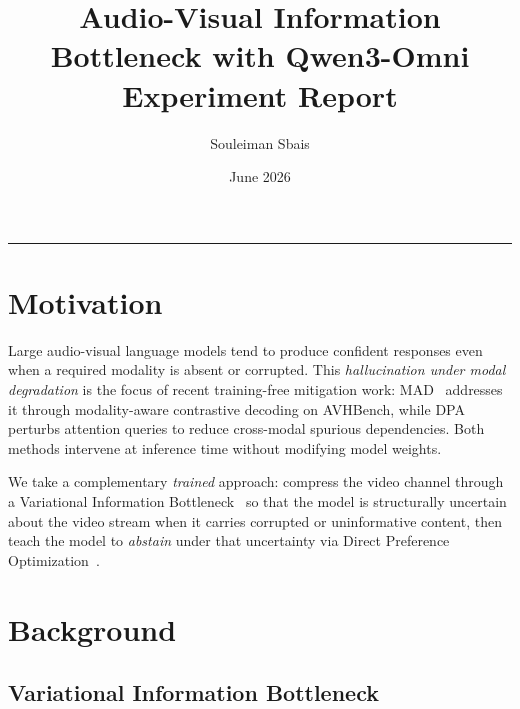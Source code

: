 \documentclass[11pt,a4paper]{article}
\title{\textbf{Audio-Visual Information Bottleneck with Qwen3-Omni}\\
       \large Experiment Report}
\author{Souleiman Sbais}
\date{June 2026}
\begin{document}
\maketitle
\tableofcontents
\vspace{1em}\hrule\vspace{1em}

\section{Motivation}

Large audio-visual language models tend to produce confident responses even
when a required modality is absent or corrupted.
This \emph{hallucination under modal degradation} is the focus of recent
training-free mitigation work: MAD~\cite{mad2026} addresses it through
modality-aware contrastive decoding on AVHBench, while DPA~\cite{dpa2026}
perturbs attention queries to reduce cross-modal spurious dependencies.
Both methods intervene at inference time without modifying model weights.

We take a complementary \emph{trained} approach: compress the video channel
through a Variational Information Bottleneck~\cite{alemi2017vib} so that the
model is structurally uncertain about the video stream when it carries
corrupted or uninformative content, then teach the model to \emph{abstain}
under that uncertainty via Direct Preference Optimization~\cite{rafailov2023dpo}.

\section{Background}

\subsection{Variational Information Bottleneck}
\end{document}
